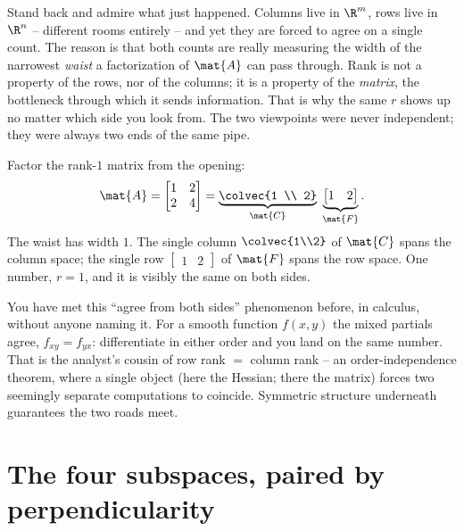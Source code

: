 \begin{aestheticbox}
Stand back and admire what just happened. Columns live in $\R^m$, rows live in
$\R^n$ -- different rooms entirely -- and yet they are forced to agree on a single
count. The reason is that both counts are really measuring the width of the
narrowest \emph{waist} a factorization of $\mat{A}$ can pass through. Rank is not a
property of the rows, nor of the columns; it is a property of the \emph{matrix},
the bottleneck through which it sends information. That is why the same $r$ shows
up no matter which side you look from. The two viewpoints were never independent;
they were always two ends of the same pipe.
\end{aestheticbox}

\begin{example}\label{ch16:rankfac-num}
Factor the rank-$1$ matrix from the opening:
\[
  \mat{A} = \begin{bmatrix} 1 & 2 \\ 2 & 4 \end{bmatrix}
  = \underbrace{\colvec{1 \\ 2}}_{\mat{C}}\;
    \underbrace{\begin{bmatrix} 1 & 2 \end{bmatrix}}_{\mat{F}}.
\]
The waist has width $1$. The single column $\colvec{1\\2}$ of $\mat{C}$ spans the
column space; the single row $\begin{bmatrix}1 & 2\end{bmatrix}$ of $\mat{F}$ spans
the row space. One number, $r=1$, and it is visibly the same on both sides.
\end{example}

\begin{connectionbox}
You have met this ``agree from both sides'' phenomenon before, in calculus,
without anyone naming it. For a smooth function $f(x,y)$ the mixed partials agree,
$f_{xy}=f_{yx}$: differentiate in either order and you land on the same number.
That is the analyst's cousin of row rank $=$ column rank -- an order-independence
theorem, where a single object (here the Hessian; there the matrix) forces two
seemingly separate computations to coincide. Symmetric structure underneath
guarantees the two roads meet.
\end{connectionbox}

\section{The four subspaces, paired by perpendicularity}

